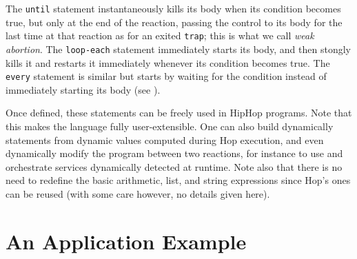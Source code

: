 \documentclass{llncs}
\begin{document}
{\footnotesize{
}}
\noindent
The {\texttt{until{}}} statement instantaneously kills its body
when its condition becomes true, but only at the end of the reaction,
passing the control to its body for the last time at that reaction as
for an exited {\texttt{trap{}}}; this is what we call {\em{weak
    abortion}}. The {\texttt{loop-each{}}} statement
immediately starts its body, and then stongly kills it and restarts it
immediately whenever its condition becomes true.  The
{\texttt{every{}}} statement is similar but starts by waiting
for the condition instead of immediately starting its body (see
\cite{CompilingEsterel}).

Once defined, these statements can be freely used in HipHop
programs. Note that this makes the language fully user-extensible. One
can also build dynamically statements from dynamic values computed
during Hop execution, and even dynamically modify the program between
two reactions, for instance to use and orchestrate services dynamically detected at runtime.
Note also that there is no need to redefine the
basic arithmetic, list, and string expressions since Hop's ones can be
reused (with some care however, no details given here). 

\section{An Application Example}
\label{Applications}
\end{document}
